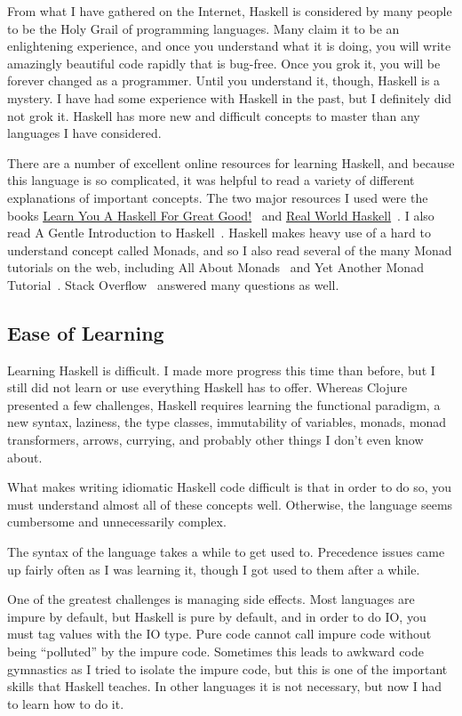 \documentclass{article}
\begin{document}
From what I have gathered on the Internet, Haskell is considered by many people
to be the Holy Grail of programming languages.  Many claim it to be an
enlightening experience, and once you understand what it is doing, you will
write amazingly beautiful code rapidly that is bug-free.  Once you grok it, you
will be forever changed as a programmer.  Until you understand it, though,
Haskell is a mystery.  I have had some experience with Haskell in the past, but
I definitely did not grok it.  Haskell has more new and difficult concepts to
master than any languages I have considered.

There are a number of excellent online resources for learning Haskell, and
because this language is so complicated, it was helpful to read a variety of
different explanations of important concepts.  The two major resources I used
were the books \underline{Learn You A Haskell For Great
Good!}~\cite{learnyouahaskell} and \underline{Real World
Haskell}~\cite{realworldhaskell}.  I also read A Gentle Introduction to
Haskell~\cite{gentleintroduction}.  Haskell makes heavy use of a hard to
understand concept called Monads, and so I also read several of the many Monad
tutorials on the web, including All About Monads~\cite{allaboutmonads} and Yet
Another Monad Tutorial~\cite{yamt}.  Stack Overflow~\cite{stackoverflow}
answered many questions as well.

\subsection{Ease of Learning}

Learning Haskell is difficult.  I made more progress this time than before,
but I still did not learn or use everything Haskell has to offer.  Whereas
Clojure presented a few challenges, Haskell requires learning the functional
paradigm, a new syntax, laziness, the type classes, immutability of variables,
monads, monad transformers, arrows, currying, and probably other things I don't
even know about.

What makes writing idiomatic Haskell code difficult is that in order to do so,
you must understand almost all of these concepts well.  Otherwise, the
language seems cumbersome and unnecessarily complex.

The syntax of the language takes a while to get used to.  Precedence issues came
up fairly often as I was learning it, though I got used to them after a while.

One of the greatest challenges is managing side effects.  Most languages are
impure by default, but Haskell is pure by default, and in order to do IO, you
must tag values with the IO type.  Pure code cannot call impure code without
being ``polluted'' by the impure code.  Sometimes this leads to awkward code
gymnastics as I tried to isolate the impure code, but this is one of the
important skills that Haskell teaches.  In other languages it is not necessary,
but now I had to learn how to do it.
\end{document}
